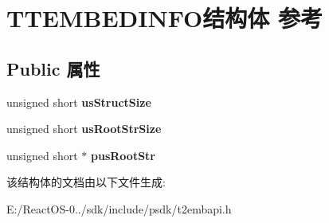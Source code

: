 \hypertarget{struct_t_t_e_m_b_e_d_i_n_f_o}{}\section{T\+T\+E\+M\+B\+E\+D\+I\+N\+F\+O结构体 参考}
\label{struct_t_t_e_m_b_e_d_i_n_f_o}
\subsection*{Public 属性}
\begin{DoxyCompactItemize}
\item 
\mbox{\label{struct_t_t_e_m_b_e_d_i_n_f_o_a7aa4cb1f0ba14088ad2852c000a953f7}} 
unsigned short {\bfseries us\+Struct\+Size}
\item 
\mbox{\label{struct_t_t_e_m_b_e_d_i_n_f_o_a085f70ed34077fcc25cc42d76dcd1414}} 
unsigned short {\bfseries us\+Root\+Str\+Size}
\item 
\mbox{\label{struct_t_t_e_m_b_e_d_i_n_f_o_ac031bd51d549d4e8260b78dd45e71481}} 
unsigned short $\ast$ {\bfseries pus\+Root\+Str}
\end{DoxyCompactItemize}


该结构体的文档由以下文件生成\+:\begin{DoxyCompactItemize}
\item 
E\+:/\+React\+O\+S-\/0../sdk/include/psdk/t2embapi.\+h\end{DoxyCompactItemize}
